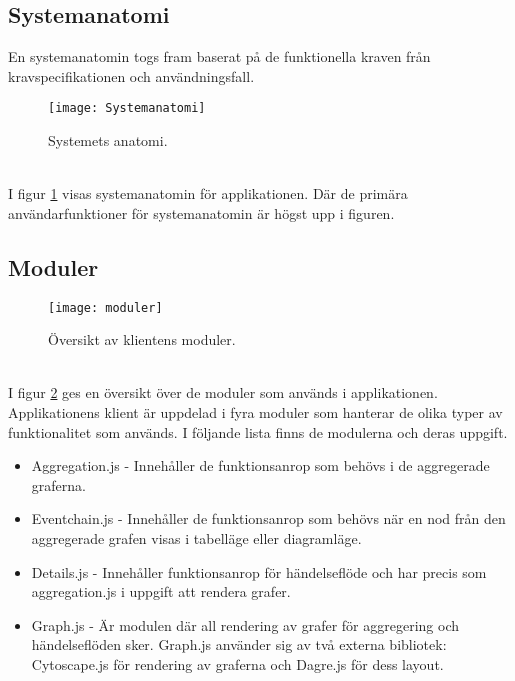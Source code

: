 \subsection{Systemanatomi}
\label{subsec:results_anatomy}
En systemanatomin togs fram baserat på de funktionella kraven från kravspecifikationen och användningsfall.
\begin{figure}[H]
    \centering
    \texttt{[image: Systemanatomi]}
    \caption{Systemets anatomi.}
    \label{fig:systemanatomi}
\end{figure}
\ \\I figur \ref{fig:systemanatomi} visas systemanatomin för applikationen. Där de primära användarfunktioner för systemanatomin är högst upp i figuren.

\subsection{Moduler}
\label{subsec:results-modules}
\begin{figure}[h]
    \centering
    \texttt{[image: moduler]}
    \caption{Översikt av klientens moduler.}
    \label{fig:module_overview}
\end{figure}
\ \\
I figur \ref{fig:module_overview} ges en översikt över de moduler som används i applikationen. Applikationens klient är uppdelad i fyra moduler som hanterar de olika typer av funktionalitet som används. I följande lista finns de modulerna och deras uppgift.
\begin{itemize}
  \item Aggregation.js - Innehåller de funktionsanrop som behövs i de aggregerade graferna.
  \item Eventchain.js - Innehåller de funktionsanrop som behövs när en nod från den aggregerade grafen visas i tabelläge eller diagramläge.
  \item Details.js - Innehåller funktionsanrop för händelseflöde och har precis som aggregation.js i uppgift att rendera grafer.
  \item Graph.js - Är modulen där all rendering av grafer för aggregering och händelseflöden sker. Graph.js använder sig av två externa bibliotek: Cytoscape.js för rendering av graferna och Dagre.js för dess layout.
\end{itemize}

